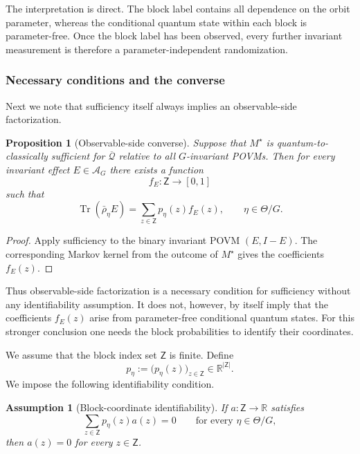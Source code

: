 \documentclass{article}
\newtheorem{prop}[theorem]{Proposition}
\newtheorem{assumption}[theorem]{Assumption}
\theoremstyle{named}
\theoremstyle{named1}
\newcommand{\Tr}{\operatorname{Tr}}
\newcommand{\cQ}{\mathcal Q}
\newcommand{\cA}{\mathcal A}
\theoremstyle{plain}
\theoremstyle{remark}
\begin{document}
The interpretation is direct. The block label contains all dependence on the
orbit parameter, whereas the conditional quantum state within each block is
parameter-free. Once the block label has been observed, every further invariant
measurement is therefore a parameter-independent randomization.

\subsubsection{Necessary conditions and the converse}

Next we note that sufficiency itself always implies an observable-side factorization.

\begin{prop}[Observable-side converse]
\label{prop:observable-side-converse}
Suppose that $M^\star$ is quantum-to-classically sufficient for
$\overline{\cQ}$ relative to all $G$-invariant POVMs. Then for every invariant
effect $E\in\cA_G$ there exists a function
\[
    f_E:\mathsf Z\to[0,1]
\]
such that
\begin{equation}
    \Tr(\bar\rho_\eta E)
    =
    \sum_{z\in\mathsf Z}
    p_\eta(z)f_E(z),
    \qquad
    \eta\in\Theta/G.
    \label{eq:observable-factorization}
\end{equation}
\end{prop}

\begin{proof}
Apply sufficiency to the binary invariant POVM $(E,I-E)$. The corresponding
Markov kernel from the outcome of $M^\star$ gives the coefficients
$f_E(z)$.
\end{proof}

Thus observable-side factorization is a necessary condition for sufficiency
without any identifiability assumption. It does not, however, by itself imply
that the coefficients $f_E(z)$ arise from parameter-free conditional quantum
states. For this stronger conclusion one needs the block probabilities to
identify their coordinates.

We assume that the block index set
$\mathsf Z$ is finite. Define
\[
    p_\eta
    :=
    \bigl(p_\eta(z)\bigr)_{z\in\mathsf Z}
    \in\mathbb R^{|\mathsf Z|}.
\]
We impose the following identifiability condition.

\begin{assumption}[Block-coordinate identifiability]
\label{ass:block-coordinate-identifiability}
If $a:\mathsf Z\to\mathbb R$ satisfies
\[
    \sum_{z\in\mathsf Z}p_\eta(z)a(z)=0
    \qquad
    \text{for every }\eta\in\Theta/G,
\]
then $a(z)=0$ for every $z\in\mathsf Z$.
\end{assumption}
\end{document}
